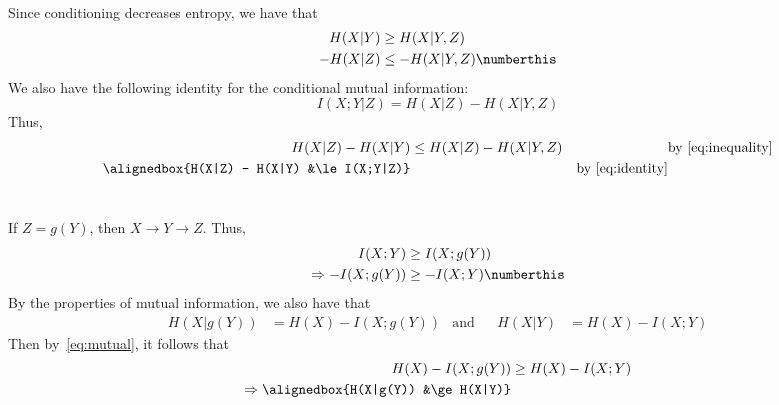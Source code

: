 \documentclass[
  coursecode={MTHE 474},
  assignmentname={Homework \homeworknumber},
  studentnumber=20053722,
  name={Bryan Hoang}
]{
  ltxanswer%
}
\begin{document}
  \begin{questions}
    \setcounter{question}{\questionnumber}
    \addtocounter{question}{-1}
    \question{}
    \begin{parts}
      \
      \part{}
      \begin{solution}
        Since conditioning decreases entropy, we have that
        \begin{align*}
          H(X|Y)  &\ge H(X|Y,Z)                                  \\
          -H(X|Z) &\le -H(X|Y,Z)\numberthis\label{eq:inequality}
        \end{align*}
        We also have the following identity for the conditional mutual information:
        \begin{equation}\label{eq:identity}
          I(X;Y|Z) = H(X|Z) - H(X|Y,Z)
        \end{equation}
        Thus,
        \begin{align*}
          H(X|Z) - H(X|Y)             &\le H(X|Z) - H(X|Y,Z) & &\text{by~\eqref{eq:inequality}} \\
          \alignedbox{H(X|Z) - H(X|Y) &\le I(X;Y|Z)}         & &\text{by~\eqref{eq:identity}}
        \end{align*}
      \end{solution}

      \part{}
      \begin{solution}
        If \(Z = g(Y)\), then \(X \rightarrow Y \rightarrow Z\). Thus,
        \begin{align*}
          I(X;Y)                 &\ge I(X;g(Y))                           \\
          \Rightarrow -I(X;g(Y)) &\ge -I(X;Y)\numberthis\label{eq:mutual}
        \end{align*}
        By the properties of mutual information, we also have that
        \begin{align*}
          H(X|g(Y)) &= H(X) - I(X;g(Y)) &\text{and} & &H(X|Y) &= H(X) - I(X;Y)
        \end{align*}
        Then by~\eqref{eq:mutual}, it follows that
        \begin{align*}
          H(X) - I(X;g(Y))                  &\ge H(X) - I(X;Y) \\
          \Rightarrow \alignedbox{H(X|g(Y)) &\ge H(X|Y)}
        \end{align*}
      \end{solution}


\end{parts}
\end{questions}
\end{document}
